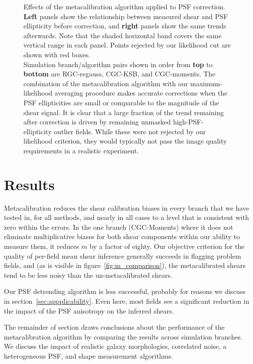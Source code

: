 \documentclass[iop]{emulateapj}
\begin{document}
\begin{figure}
\begin{center}
\end{center}
\caption{Effects of the metacalibration algorithm applied to PSF
  correction. {\bf Left} panels show the relationship between measured
  shear and PSF ellipticity before correction, and {\bf right} panels
  show the same trends afterwards. Note that the shaded horizontal
  band covers the same vertical range in each panel. Points
  rejected by our likelihood cut are shown with red boxes.  \\
  Simulation branch/algorithm pairs shown in order from {\bf top} to
  {\bf bottom} are RGC-regauss, CGC-KSB, and CGC-moments. The
  combination of the metacalibration algorithm with our
  maximum-likelihood averaging procedure makes accurate corrections
  when the PSF ellipticities are small or comparable to the magnitude
  of the shear signal. It is clear that a large fraction of the trend
  remaining after correction is driven by remaining unmasked
  high-PSF-ellipticity outlier fields. While these were not rejected
  by our likelihood criterion, they would typically not pass the image
  quality requirements in a realistic experiment.}
\label{fig:psf_trends}
\end{figure}



\section{Results}
Metacalibration reduces the shear calibration biases in every branch
that we have tested in, for all methods, and nearly in all cases to a level that is consistent with
zero within the errors. In the one branch (CGC-Moments) where it does not
eliminate multiplicative biases for both shear components within our
ability to measure them, it reduces $m$ by a factor of eighty. Our
objective criterion for the quality of per-field mean shear inference
generally succeeds in flagging problem fields, and (as is visible in
figure~\ref{fig:m_comparison}), the metacalibrated shears tend to be
less noisy than the un-metacalibrated shears.

Our PSF detrending algorithm is less successful, probably for reasons
we discuss in section~\ref{sec:appplicability}. Even here, most fields
see a significant reduction in the impact of the PSF anisotropy on the inferred
shears.

The remainder of section draws conclusions about the performance of the
metacalibration algorithm by comparing the results across simulation
branches. We discuss the impact of realistic galaxy morphologies,
correlated noise, a heterogeneous PSF, and shape measurement
algorithms.
\end{document}
